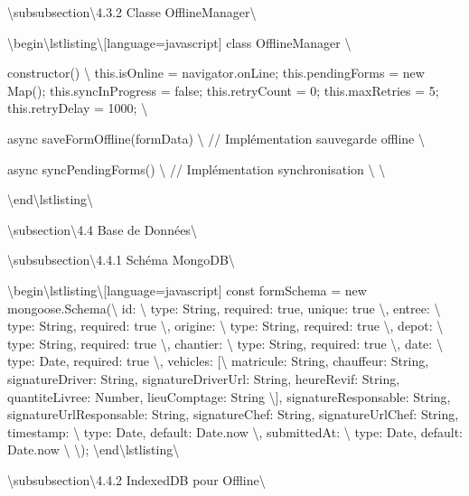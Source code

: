 \documentclass[12pt,a4paper]{report}
\begin{document}
\textbackslash{}subsubsection\textbackslash{}{4.3.2 Classe OfflineManager\textbackslash{}}

\textbackslash{}begin\textbackslash{}{lstlisting\textbackslash{}}[language=javascript]
class OfflineManager \textbackslash{}{
    constructor() \textbackslash{}{
        this.isOnline = navigator.onLine;
        this.pendingForms = new Map();
        this.syncInProgress = false;
        this.retryCount = 0;
        this.maxRetries = 5;
        this.retryDelay = 1000;
    \textbackslash{}}
    
    async saveFormOffline(formData) \textbackslash{}{
        // Implémentation sauvegarde offline
    \textbackslash{}}
    
    async syncPendingForms() \textbackslash{}{
        // Implémentation synchronisation
    \textbackslash{}}
\textbackslash{}}
\textbackslash{}end\textbackslash{}{lstlisting\textbackslash{}}

\textbackslash{}subsection\textbackslash{}{4.4 Base de Données\textbackslash{}}

\textbackslash{}subsubsection\textbackslash{}{4.4.1 Schéma MongoDB\textbackslash{}}

\textbackslash{}begin\textbackslash{}{lstlisting\textbackslash{}}[language=javascript]
const formSchema = new mongoose.Schema(\textbackslash{}{
    id: \textbackslash{}{ type: String, required: true, unique: true \textbackslash{}},
    entree: \textbackslash{}{ type: String, required: true \textbackslash{}},
    origine: \textbackslash{}{ type: String, required: true \textbackslash{}},
    depot: \textbackslash{}{ type: String, required: true \textbackslash{}},
    chantier: \textbackslash{}{ type: String, required: true \textbackslash{}},
    date: \textbackslash{}{ type: Date, required: true \textbackslash{}},
    vehicles: [\textbackslash{}{
        matricule: String,
        chauffeur: String,
        signatureDriver: String,
        signatureDriverUrl: String,
        heureRevif: String,
        quantiteLivree: Number,
        lieuComptage: String
    \textbackslash{}}],
    signatureResponsable: String,
    signatureUrlResponsable: String,
    signatureChef: String,
    signatureUrlChef: String,
    timestamp: \textbackslash{}{ type: Date, default: Date.now \textbackslash{}},
    submittedAt: \textbackslash{}{ type: Date, default: Date.now \textbackslash{}}
\textbackslash{}});
\textbackslash{}end\textbackslash{}{lstlisting\textbackslash{}}

\textbackslash{}subsubsection\textbackslash{}{4.4.2 IndexedDB pour Offline\textbackslash{}}
\end{document}
